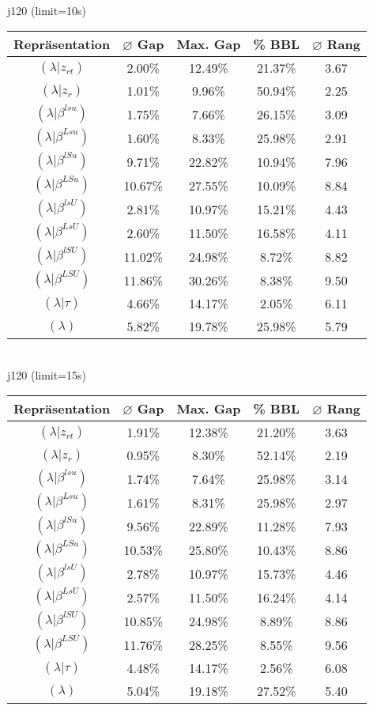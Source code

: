 \documentclass{scrartcl}
\begin{document}
\\[8pt]j120 (limit=10s)\\\begin{tabular}{ccccc}
\hline
Repräsentation & $\varnothing$ Gap & Max. Gap & \% BBL & $\varnothing$ Rang\\[3pt]
\hline
$(\lambda|z_{rt})$&2.00\%&12.49\%&21.37\%&3.67\\
\hline
$(\lambda|z_r)$&1.01\%&9.96\%&50.94\%&2.25\\
\hline
$(\lambda|\beta^{lsu})$&1.75\%&7.66\%&26.15\%&3.09\\
\hline
$(\lambda|\beta^{Lsu})$&1.60\%&8.33\%&25.98\%&2.91\\
\hline
$(\lambda|\beta^{lSu})$&9.71\%&22.82\%&10.94\%&7.96\\
\hline
$(\lambda|\beta^{LSu})$&10.67\%&27.55\%&10.09\%&8.84\\
\hline
$(\lambda|\beta^{lsU})$&2.81\%&10.97\%&15.21\%&4.43\\
\hline
$(\lambda|\beta^{LsU})$&2.60\%&11.50\%&16.58\%&4.11\\
\hline
$(\lambda|\beta^{lSU})$&11.02\%&24.98\%&8.72\%&8.82\\
\hline
$(\lambda|\beta^{LSU})$&11.86\%&30.26\%&8.38\%&9.50\\
\hline
$(\lambda|\tau)$&4.66\%&14.17\%&2.05\%&6.11\\
\hline
$(\lambda)$&5.82\%&19.78\%&25.98\%&5.79\\\hline
\end{tabular}
\\[8pt]j120 (limit=15s)\\\begin{tabular}{ccccc}
\hline
Repräsentation & $\varnothing$ Gap & Max. Gap & \% BBL & $\varnothing$ Rang\\[3pt]
\hline
$(\lambda|z_{rt})$&1.91\%&12.38\%&21.20\%&3.63\\
\hline
$(\lambda|z_r)$&0.95\%&8.30\%&52.14\%&2.19\\
\hline
$(\lambda|\beta^{lsu})$&1.74\%&7.64\%&25.98\%&3.14\\
\hline
$(\lambda|\beta^{Lsu})$&1.61\%&8.31\%&25.98\%&2.97\\
\hline
$(\lambda|\beta^{lSu})$&9.56\%&22.89\%&11.28\%&7.93\\
\hline
$(\lambda|\beta^{LSu})$&10.53\%&25.80\%&10.43\%&8.86\\
\hline
$(\lambda|\beta^{lsU})$&2.78\%&10.97\%&15.73\%&4.46\\
\hline
$(\lambda|\beta^{LsU})$&2.57\%&11.50\%&16.24\%&4.14\\
\hline
$(\lambda|\beta^{lSU})$&10.85\%&24.98\%&8.89\%&8.86\\
\hline
$(\lambda|\beta^{LSU})$&11.76\%&28.25\%&8.55\%&9.56\\
\hline
$(\lambda|\tau)$&4.48\%&14.17\%&2.56\%&6.08\\
\hline
$(\lambda)$&5.04\%&19.18\%&27.52\%&5.40\\\hline
\end{tabular}
\\[8pt]
\newpage
\end{document}
